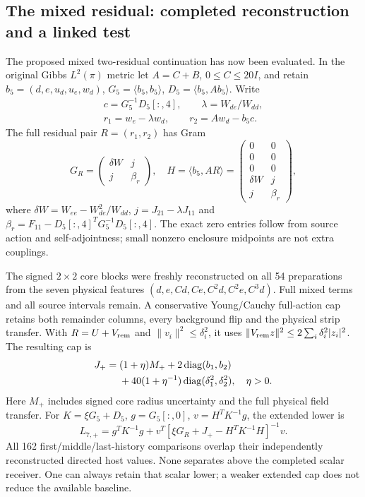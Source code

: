 \subsection{The mixed residual: completed reconstruction and a linked test}
\label{sec:mixed-residual-12}

The proposed mixed two-residual continuation has now been evaluated.
In the original Gibbs $L^2(\pi)$ metric let $A=C+B$, $0\le C\le20I$,
and retain $b_5=(d,e,u_d,u_e,w_d)$, $G_5=\langle b_5,b_5\rangle$,
$D_5=\langle b_5,Ab_5\rangle$. Write
\begin{equation}
\begin{gathered}
 c=G_5^{-1}D_5[:,4],\qquad\lambda=W_{de}/W_{dd},\\
 r_1=w_e-\lambda w_d,\qquad r_2=Aw_d-b_5c.
\end{gathered}
\end{equation}
The full residual pair $R=(r_1,r_2)$ has Gram
\begin{equation}
 G_R=\begin{pmatrix}\delta W&j\\j&\beta_r\end{pmatrix},
 \quad H=\langle b_5,AR\rangle
 =\begin{pmatrix}0&0\\0&0\\0&0\\\delta W&j\\j&\beta_r\end{pmatrix},
\end{equation}
where $\delta W=W_{ee}-W_{de}^2/W_{dd}$,
$j=J_{21}-\lambda J_{11}$ and
$\beta_r=F_{11}-D_5[:,4]^TG_5^{-1}D_5[:,4]$.
The exact zero entries follow from source action and self-adjointness;
small nonzero enclosure midpoints are not extra couplings.

The signed $2\times2$ core blocks were freshly reconstructed on all
54 preparations from the seven physical features
$(d,e,Cd,Ce,C^2d,C^2e,C^3d)$. Full mixed terms and all source intervals
remain. A conservative Young/Cauchy full-action cap retains both
remainder columns, every background flip and the physical strip transfer.
With $R=U+V_{\rm rem}$ and $\|v_i\|^2\le\delta_i^2$, it uses
$\|V_{\rm rem}z\|^2\le2\sum_i\delta_i^2|z_i|^2$. The resulting cap is
\begin{equation}
\begin{split}
 J_+={}&(1+\eta)M_++2\operatorname{diag}(b_1,b_2)\\
 &+40(1+\eta^{-1})\operatorname{diag}(\delta_1^2,\delta_2^2),\quad\eta>0.
\end{split}
\end{equation}
Here $M_+$ includes signed core radius uncertainty and the full physical
field transfer. For $K=\xi G_5+D_5$, $g=G_5[:,0]$,
$v=H^TK^{-1}g$, the extended lower is
\begin{equation}
 L_{7,+}=g^TK^{-1}g+
 v^T[\xi G_R+J_+-H^TK^{-1}H]^{-1}v.
\end{equation}
All 162 first/middle/last-history comparisons overlap their independently
reconstructed directed host values. None separates above the completed
scalar receiver. One can always retain that scalar lower; a weaker
extended cap does not reduce the available baseline.

